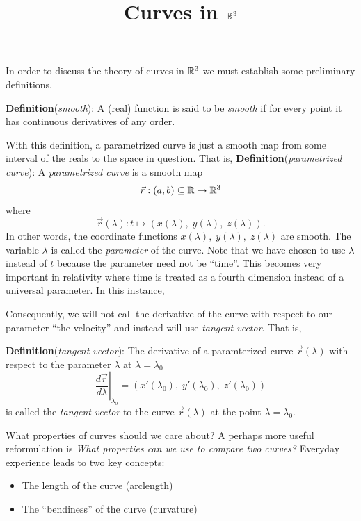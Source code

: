 

\title{Curves in $\mathbb{R}^3$}


\maketitle
In order to discuss the theory of curves in $\mathbb{R}^3$ we must establish some
preliminary definitions.

\textbf{Definition}(\textit{smooth}): A (real) function is said to be \textit{smooth} if for every
point it has continuous derivatives of any order.

With this definition, a parametrized curve is just a smooth map from some
interval of the reals to the space in question. That is,
\textbf{Definition}(\textit{parametrized curve}): 
A \textit{parametrized curve} is a smooth map
\begin{equation}
  \vec{r}:(a,b)\subseteq \mathbb{R} \to \mathbb{R}^3
\end{equation}
where
\begin{equation}
  \vec{r}(\lambda): t\mapsto (x(\lambda),\; y(\lambda),\; z(\lambda)).
\end{equation}
In other words, the coordinate functions $x(\lambda),\;y(\lambda),\;z(\lambda)$ are smooth. The
variable $\lambda$ is called the \textit{parameter} of the curve. Note that we
have chosen to use $\lambda$ instead of $t$ because the parameter need not be
``time''. This becomes very important in relativity where time is treated as a
fourth dimension instead of a universal parameter. In this instance, 

Consequently, we will not call the derivative of the curve with respect to our
parameter ``the velocity'' and instead will use \textit{tangent vector}. That
is,

\textbf{Definition}(\textit{tangent vector}): The derivative of a paramterized
curve $\vec{r}(\lambda)$ with respect to the parameter $\lambda$ at $\lambda = \lambda_0$
\begin{equation}
  \left.\frac{d\vec{r}}{d\lambda}\right|_{\lambda_0} = (x'(\lambda_0),\; y'(\lambda_0),\; z'(\lambda_0))
\end{equation}
is called the \textit{tangent vector} to the curve $\vec{r}(\lambda)$ at the
point $\lambda=\lambda_0$.

What properties of curves should we care about? A perhaps more useful
reformulation is \textit{What properties can we use to compare two
  curves?} Everyday experience leads to two key concepts:
\begin{itemize}
\item The length of the curve (arclength)
\item The ``bendiness'' of the curve (curvature)
\end{itemize}

